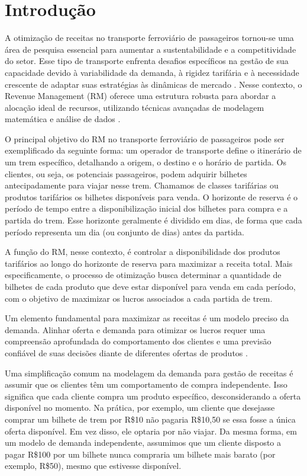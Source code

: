 \chapter*{Introdução}\label{cap:introduction}

A otimização de receitas no transporte ferroviário de passageiros tornou-se uma área de pesquisa essencial para aumentar a sustentabilidade e a competitividade do setor. Esse tipo de transporte enfrenta desafios específicos na gestão de sua capacidade devido à variabilidade da demanda, à rigidez tarifária e à necessidade crescente de adaptar suas estratégias às dinâmicas de mercado \cite{Guerriero2021}. Nesse contexto, o Revenue Management (RM) oferece uma estrutura robusta para abordar a alocação ideal de recursos, utilizando técnicas avançadas de modelagem matemática e análise de dados \cite{Ammirato}.

O principal objetivo do RM no transporte ferroviário de passageiros pode ser exemplificado da seguinte forma: um operador de transporte define o itinerário de um trem específico, detalhando a origem, o destino e o horário de partida. Os clientes, ou seja, os potenciais passageiros, podem adquirir bilhetes antecipadamente para viajar nesse trem. Chamamos de classes tarifárias ou produtos tarifários os bilhetes disponíveis para venda. O horizonte de reserva é o período de tempo entre a disponibilização inicial dos bilhetes para compra e a partida do trem. Esse horizonte geralmente é dividido em dias, de forma que cada período representa um dia (ou conjunto de dias) antes da partida.

A função do RM, nesse contexto, é controlar a disponibilidade dos produtos tarifários ao longo do horizonte de reserva para maximizar a receita total. Mais especificamente, o processo de otimização busca determinar a quantidade de bilhetes de cada produto que deve estar disponível para venda em cada período, com o objetivo de maximizar os lucros associados a cada partida de trem.

Um elemento fundamental para maximizar as receitas é um modelo preciso da demanda. Alinhar oferta e demanda para otimizar os lucros requer uma compreensão aprofundada do comportamento dos clientes e uma previsão confiável de suas decisões diante de diferentes ofertas de produtos \cite{ZHAO2019776}.

Uma simplificação comum na modelagem da demanda para gestão de receitas é assumir que os clientes têm um comportamento de compra independente. Isso significa que cada cliente compra um produto específico, desconsiderando a oferta disponível no momento. Na prática, por exemplo, um cliente que desejasse comprar um bilhete de trem por R\$10 não pagaria R\$10,50 se essa fosse a única oferta disponível. Em vez disso, ele optaria por não viajar. Da mesma forma, em um modelo de demanda independente, assumimos que um cliente disposto a pagar R\$100 por um bilhete nunca compraria um bilhete mais barato (por exemplo, R\$50), mesmo que estivesse disponível.

